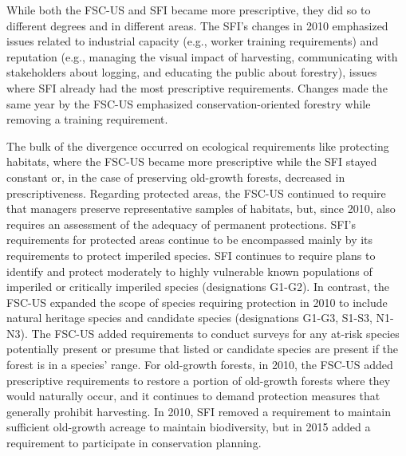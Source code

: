 \documentclass[
      12pt,
            Review ]{article}
\begin{document}


While both the FSC-US and SFI became more prescriptive, they did so to different degrees and in different areas. The SFI's changes in 2010 emphasized issues related to industrial capacity (e.g., worker training requirements) and reputation (e.g., managing the visual impact of harvesting, communicating with stakeholders about logging, and educating the public about forestry), issues where SFI already had the most prescriptive requirements. Changes made the same year by the FSC-US emphasized conservation-oriented forestry while removing a training requirement.

The bulk of the divergence occurred on ecological requirements like protecting habitats, where the FSC-US became more prescriptive while the SFI stayed constant or, in the case of preserving old-growth forests, decreased in prescriptiveness. Regarding protected areas, the FSC-US continued to require that managers preserve representative samples of habitats, but, since 2010, also requires an assessment of the adequacy of permanent protections. SFI's requirements for protected areas continue to be encompassed mainly by its requirements to protect imperiled species. SFI continues to require plans to identify and protect moderately to highly vulnerable known populations of imperiled or critically imperiled species (designations G1-G2). In contrast, the FSC-US expanded the scope of species requiring protection in 2010 to include natural heritage species and candidate species (designations G1-G3, S1-S3, N1-N3). The FSC-US added requirements to conduct surveys for any at-risk species potentially present or presume that listed or candidate species are present if the forest is in a species' range. For old-growth forests, in 2010, the FSC-US added prescriptive requirements to restore a portion of old-growth forests where they would naturally occur, and it continues to demand protection measures that generally prohibit harvesting. In 2010, SFI removed a requirement to maintain sufficient old-growth acreage to maintain biodiversity, but in 2015 added a requirement to participate in conservation planning.
\end{document}
